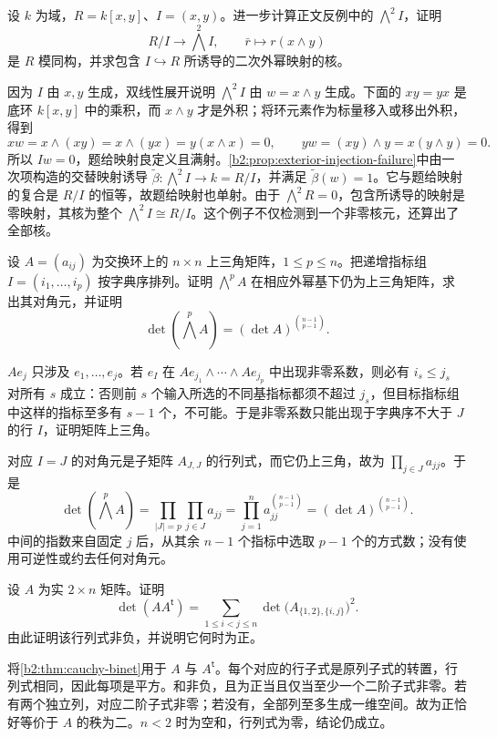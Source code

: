 \begin{exercise}\label{b2:ex:09-exterior-not-injective}
	设 \(k\) 为域，\(R=k[x,y]\)、\(I=(x,y)\)。进一步计算正文反例中的 \(\bigwedge^2I\)，证明
	\[
		R/I\longrightarrow\bigwedge^2I,\qquad \bar r\longmapsto r(x\wedge y)
	\]
	是 \(R\) 模同构，并求包含 \(I\hookrightarrow R\) 所诱导的二次外幂映射的核。
\end{exercise}
\begin{solution}
	因为 \(I\) 由 \(x,y\) 生成，双线性展开说明 \(\bigwedge^2I\) 由 \(w=x\wedge y\) 生成。下面的 \(xy=yx\) 是底环 \(k[x,y]\) 中的乘积，而 \(x\wedge y\) 才是外积；将环元素作为标量移入或移出外积，得到
	\[
		xw=x\wedge(xy)=x\wedge(yx)=y(x\wedge x)=0, \qquad yw=(xy)\wedge y=x(y\wedge y)=0.
	\]
	所以 \(Iw=0\)，题给映射良定义且满射。\cref{b2:prop:exterior-injection-failure}中由一次项构造的交替映射诱导 \(\widetilde\beta:\bigwedge^2I\to k=R/I\)，并满足 \(\widetilde\beta(w)=1\)。它与题给映射的复合是 \(R/I\) 的恒等，故题给映射也单射。由于 \(\bigwedge^2R=0\)，包含所诱导的映射是零映射，其核为整个 \(\bigwedge^2I\cong R/I\)。这个例子不仅检测到一个非零核元，还算出了全部核。
\end{solution}

\begin{exercise}\label{b2:ex:09-determinant-basis-change}
	设 \(A=(a_{ij})\) 为交换环上的 \(n\times n\) 上三角矩阵，\(1\le p\le n\)。把递增指标组 \(I=(i_1,\ldots,i_p)\) 按字典序排列。证明 \(\bigwedge^pA\) 在相应外幂基下仍为上三角矩阵，求出其对角元，并证明
	\[
		\det\left(\bigwedge^pA\right)=(\det A)^{\binom{n-1}{p-1}}.
	\]
\end{exercise}
\begin{solution}
	\(Ae_j\) 只涉及 \(e_1,\ldots,e_j\)。若 \(e_I\) 在 \(Ae_{j_1}\wedge\cdots\wedge Ae_{j_p}\) 中出现非零系数，则必有 \(i_s\le j_s\) 对所有 \(s\) 成立：否则前 \(s\) 个输入所选的不同基指标都须不超过 \(j_s\)，但目标指标组中这样的指标至多有 \(s-1\) 个，不可能。于是非零系数只能出现于字典序不大于 \(J\) 的行 \(I\)，证明矩阵上三角。

	对应 \(I=J\) 的对角元是子矩阵 \(A_{J,J}\) 的行列式，而它仍上三角，故为 \(\prod_{j\in J}a_{jj}\)。于是
	\[
		\det\left(\bigwedge^pA\right) =\prod_{|J|=p}\prod_{j\in J}a_{jj} =\prod_{j=1}^n a_{jj}^{\binom{n-1}{p-1}} =(\det A)^{\binom{n-1}{p-1}}.
	\]
	中间的指数来自固定 \(j\) 后，从其余 \(n-1\) 个指标中选取 \(p-1\) 个的方式数；没有使用可逆性或约去任何对角元。
\end{solution}

\begin{exercise}\label{b2:ex:09-gram-cauchy-binet}
	设 \(A\) 为实 \(2\times n\) 矩阵。证明
	\[
		\det(AA^{\mathsf t})=\sum_{1\le i<j\le n}\det\bigl(A_{\{1,2\},\{i,j\}}\bigr)^2.
	\]
	由此证明该行列式非负，并说明它何时为正。
\end{exercise}
\begin{solution}
	将\cref{b2:thm:cauchy-binet}用于 \(A\) 与 \(A^{\mathsf t}\)。每个对应的行子式是原列子式的转置，行列式相同，因此每项是平方。和非负，且为正当且仅当至少一个二阶子式非零。若有两个独立列，对应二阶子式非零；若没有，全部列至多生成一维空间。故为正恰好等价于 \(A\) 的秩为二。\(n<2\) 时为空和，行列式为零，结论仍成立。
\end{solution}

